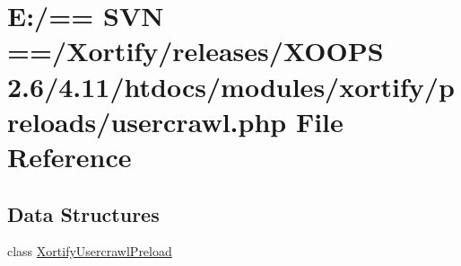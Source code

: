 \hypertarget{usercrawl_8php}{\section{E\-:/== S\-V\-N ==/\-Xortify/releases/\-X\-O\-O\-P\-S 2.6/4.11/htdocs/modules/xortify/preloads/usercrawl.php File Reference}
\label{usercrawl_8php}
}
\subsection*{Data Structures}
\begin{DoxyCompactItemize}
\item 
class \hyperlink{class_xortify_usercrawl_preload}{Xortify\-Usercrawl\-Preload}
\end{DoxyCompactItemize}
